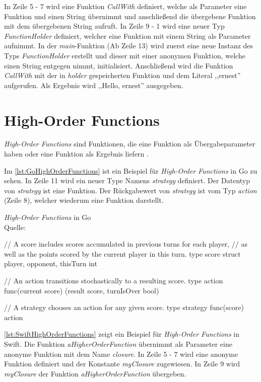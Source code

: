 In Zeile 5 - 7 wird eine Funktion \textit{CallWith} definiert, welche als Parameter eine Funktion und einen String übernimmt und anschließend die übergebene Funktion mit dem übergebenen String aufruft.
In Zeile 9 - 1 wird eine neuer Typ \textit{FunctionHolder} definiert, welcher eine Funktion mit einem String als Parameter aufnimmt.
In der \textit{main}-Funktion (Ab Zeile 13) wird zuerst eine neue Instanz des Typs \textit{FunctionHolder} erstellt und dieser mit einer anonymen Funktion, welche einen String entgegen nimmt, initialisiert.
Anschließend wird die Funktion \textit{CallWith} mit der in \textit{holder} gespeicherten Funktion und dem Literal ,,ernest'' aufgerufen.
Als Ergebnis wird ,,Hello, ernest'' ausgegeben. 

\section{High-Order Functions}
\textit{High-Order Functions} sind Funktionen, die eine Funktion als Übergabeparameter haben oder eine Funktion als Ergebnis liefern \cite[S.63]{Piepmeyer.2010}.

Im \autoref{lst:GoHighOrderFunctions} ist ein Beispiel für \textit{High-Order Functions} in Go zu sehen. 
In Zeile 11 wird ein neuer Type Namens \textit{strategy} definiert. 
Der Datentyp von \textit{strategy} ist eine Funktion.
Der Rückgabewert von \textit{strategy} ist vom Typ \textit{action} (Zeile 8), welcher wiederum eine Funktion darstellt.

\begin{listing}[H]
\caption{\textit{High-Order Functions} in Go \\ Quelle:\cite[]{Go.HighOrderFunctions}}
\label{lst:GoHighOrderFunctions}
\begin{GoCode}
// A score includes scores accumulated in previous turns for each player,
// as well as the points scored by the current player in this turn.
type score struct {
    player, opponent, thisTurn int
}

// An action transitions stochastically to a resulting score.
type action func(current score) (result score, turnIsOver bool)

// A strategy chooses an action for any given score.
type strategy func(score) action
\end{GoCode}
\end{listing}

\autoref{lst:SwiftHighOrderFunctions} zeigt ein Beispiel für \textit{High-Order Functions} in Swift.
Die Funktion \textit{aHigherOrderFunction} übernimmt als Parameter eine anonyme Funktion mit dem Name \textit{closure}.
In Zeile 5 - 7 wird eine anonyme Funktion definiert und der Konstante \textit{myClosure} zugewiesen.
In Zeile 9 wird \textit{myClosure} der Funktion \textit{aHigherOrderFunction} übergeben.

